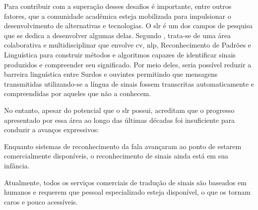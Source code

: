 Para contribuir com a superação desses desafios é importante, entre outros fatores, que a comunidade acadêmica esteja mobilizada para impulsionar o desenvolvimento de alternativas e tecnologias.
O \acrfull{slr} é um dos campos de pesquisa que se dedica a desenvolver algumas delas. Segundo , trata-se de uma área colaborativa e multidisciplinar que envolve \acrlong{cv}, \acrlong{nlp}, Reconhecimento de Padrões e Linguística para construir métodos e algoritmos capazes de identificar sinais produzidos e compreender seu significado.
Por meio deles, seria possível reduzir a barreira linguística entre Surdos e ouvintes permitindo que mensagens transmitidas utilizando-se a língua de sinais fossem transcritas automaticamente e compreendidas por aqueles que não a conhecem.



No entanto, apesar do potencial que o \acrshort{slr} possui,  acreditam que o progresso apresentado por essa área ao longo das últimas décadas foi insuficiente para conduzir a avanços expressivos:

\begin{citacao}
    Enquanto sistemas de reconhecimento da fala avançaram ao ponto de estarem comercialmente disponíveis, o reconhecimento de sinais ainda está em sua infância. 

    Atualmente, todos os serviços comerciais de tradução de sinais são baseados em humanos e requerem que pessoal especializado esteja disponível, o que os tornam caros e pouco acessíveis. \cite[tradução nossa]{cooper-2011-slr}
\end{citacao}





